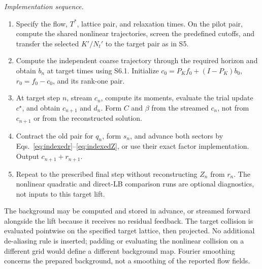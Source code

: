 \documentclass[10pt,letterpaper]{article}
\begin{document}
\textit{Implementation sequence.}
\begin{enumerate}
\item Specify the flow, $T^*$, lattice pair, and relaxation times. On the pilot pair, compute the shared nonlinear trajectories, screen the predefined cutoffs, and transfer the selected $K'/N_t'$ to the target pair as in S5.
\item Compute the independent coarse trajectory through the required horizon and obtain $b_n$ at target times using S6.1. Initialize $c_0=P_Kf_0+(I-P_K)b_0$, $r_0=f_0-c_0$, and its rank-one pair.
\item At target step $n$, stream $c_n$, compute its moments, evaluate the trial update $c^\star$, and obtain $c_{n+1}$ and $d_n$. Form $C$ and $\beta$ from the streamed $c_n$, not from $c_{n+1}$ or from the reconstructed solution.
\item Contract the old pair for $q_n$, form $s_n$, and advance both sectors by Eqs.~\eqref{eq:indexedr}--\eqref{eq:indexedZ}, or use their exact factor implementation. Output $c_{n+1}+r_{n+1}$.
\item Repeat to the prescribed final step without reconstructing $Z_n$ from $r_n$. The nonlinear quadratic and direct-LB comparison runs are optional diagnostics, not inputs to this target lift.
\end{enumerate}
The background may be computed and stored in advance, or streamed forward alongside the lift because it receives no residual feedback. The target collision is evaluated pointwise on the specified target lattice, then projected. No additional de-aliasing rule is inserted; padding or evaluating the nonlinear collision on a different grid would define a different background map. Fourier smoothing concerns the prepared background, not a smoothing of the reported flow fields.
\end{document}

